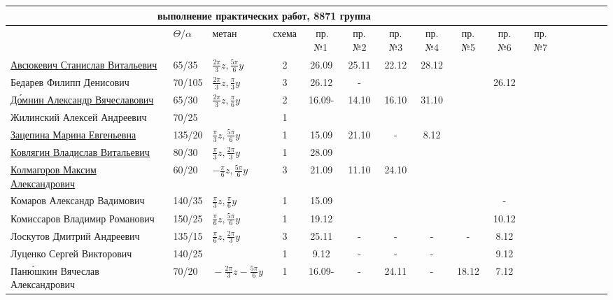 \documentclass[a4paper,landscape,11pt]{article}
\begin{document}
\newpage
%
\hspace{-4.1cm}
\begin{tabular}{l|llccccccccccccc}
\multicolumn{10}{c}{выполнение практических работ, 8871 группа} \\
\toprule
			&$\Theta/\alpha$&метан&схема&\,пр.№1\,&пр.№2&пр.№3&пр.№4&пр.№5&пр.№6&пр.№7\\
\midrule
	\href{}{Авсюкевич Станислав Витальевич}	        &65/35 &$\frac{2\pi}{3}z,\frac{5\pi}{6}y$&2&\,26.09\,&25.11&22.12&28.12\\
	Бедарев Филипп Денисович        &70/105&$\frac{2\pi}{3}z,\frac{\pi}{3}y$&3&26.12&-&&&&26.12\\
	\href{}{Д\'{о}мнин Александр Вячеславович}                  &65/30 &$\frac{2\pi}{3}z,\frac{\pi}{6}y$&2&\,16.09-\,&14.10&16.10&31.10\\ 
	Жилинский Алексей Андреевич	&70/25 &&1&       &&\\
	\href{}{Зацепина Марина Евгеньевна}	&135/20&$\frac{\pi}{3}z,\frac{5\pi}{6}y$&1&\,15.09\,&21.10&-&8.12\\	
	\href{}{Ковлягин Владислав Витальевич}	                &80/30 &$\frac{\pi}{3}z,\frac{2\pi}{3}y$&1&\,28.09\,&&\\
	\href{}{Колмагоров Максим Александрович}	        &60/20 &$-\frac{\pi}{6}z,\frac{5\pi}{6}y$&3&\,21.09\,&11.10&24.10\\
\midrule                                     
	Комаров Александр Вадимович	&140/35&$\frac{\pi}{3}z,\frac{\pi}{6}y$&1&\,15.09\,&&&&&-\\
	Комиссаров Владимир Романович	&150/25&$\frac{\pi}{6}z,\frac{5\pi}{6}y$&1&19.12&&&&&10.12\\
	Лоскутов Дмитрий Андреевич	&135/15&$\frac{\pi}{6}z,\frac{2\pi}{3}y$&3&25.11&-&-&-&-&8.12\\	
	Луценко Сергей Викторович	&140/25&&       1&9.12&-&-&-&&9.12\\	
	Пан\'{ю}шкин Вячеслав Александрович\,&70/20 &$\!-\!\frac{2\pi}{3}z\!-\!\frac{5\pi}{6}y\!$&1&\,16.09-\,&-&24.11&-&18.12&7.12\\

\end{tabular}
\end{document}
